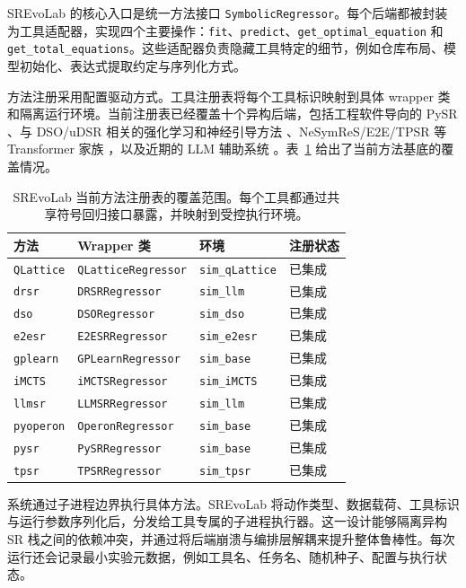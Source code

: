 \documentclass[UTF8]{ctexart}
\begin{document}
SREvoLab 的核心入口是统一方法接口 \texttt{SymbolicRegressor}。每个后端都被封装为工具适配器，实现四个主要操作：\texttt{fit}、\texttt{predict}、\texttt{get\_optimal\_equation} 和 \texttt{get\_total\_equations}。这些适配器负责隐藏工具特定的细节，例如仓库布局、模型初始化、表达式提取约定与序列化方式。

方法注册采用配置驱动方式。工具注册表将每个工具标识映射到具体 wrapper 类和隔离运行环境。当前注册表已经覆盖十个异构后端，包括工程软件导向的 PySR \citep{cranmer2023pysr}、与 DSO/uDSR 相关的强化学习和神经引导方法 \citep{petersen2021deep,mundhenk2021seeding,landajuela2022udsr}、NeSymReS/E2E/TPSR 等 Transformer 家族 \citep{biggio2021nsr,kamienny2022end,tpsr2023}，以及近期的 LLM 辅助系统 \citep{shojaee2024llm,wang2025drsr}。表~\ref{tab:method-coverage} 给出了当前方法基底的覆盖情况。

\begin{table}[t]
\centering
\scriptsize
\begin{tabular}{llll}
\toprule
方法 & Wrapper 类 & 环境 & 注册状态 \\
\midrule
\texttt{QLattice} & \texttt{QLatticeRegressor} & \texttt{sim\_qLattice} & 已集成 \\
\texttt{drsr} & \texttt{DRSRRegressor} & \texttt{sim\_llm} & 已集成 \\
\texttt{dso} & \texttt{DSORegressor} & \texttt{sim\_dso} & 已集成 \\
\texttt{e2esr} & \texttt{E2ESRRegressor} & \texttt{sim\_e2esr} & 已集成 \\
\texttt{gplearn} & \texttt{GPLearnRegressor} & \texttt{sim\_base} & 已集成 \\
\texttt{iMCTS} & \texttt{iMCTSRegressor} & \texttt{sim\_iMCTS} & 已集成 \\
\texttt{llmsr} & \texttt{LLMSRRegressor} & \texttt{sim\_llm} & 已集成 \\
\texttt{pyoperon} & \texttt{OperonRegressor} & \texttt{sim\_base} & 已集成 \\
\texttt{pysr} & \texttt{PySRRegressor} & \texttt{sim\_base} & 已集成 \\
\texttt{tpsr} & \texttt{TPSRRegressor} & \texttt{sim\_tpsr} & 已集成 \\
\bottomrule
\end{tabular}
\caption{SREvoLab 当前方法注册表的覆盖范围。每个工具都通过共享符号回归接口暴露，并映射到受控执行环境。}
\label{tab:method-coverage}
\end{table}

系统通过子进程边界执行具体方法。SREvoLab 将动作类型、数据载荷、工具标识与运行参数序列化后，分发给工具专属的子进程执行器。这一设计能够隔离异构 SR 栈之间的依赖冲突，并通过将后端崩溃与编排层解耦来提升整体鲁棒性。每次运行还会记录最小实验元数据，例如工具名、任务名、随机种子、配置与执行状态。
\end{document}
